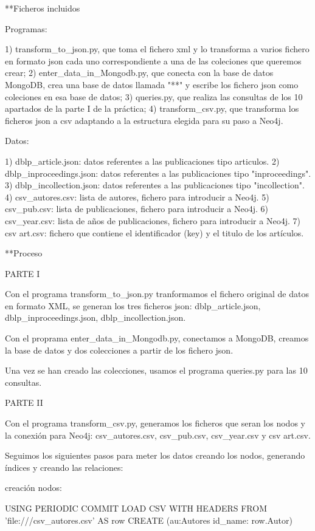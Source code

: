 **Ficheros incluidos

Programas:

1) transform_to_json.py, que toma el fichero xml y lo transforma a varios fichero en formato json cada uno correspondiente a una de las coleciones que queremos crear;
2) enter_data_in_Mongodb.py, que conecta con la base de datos MongoDB, crea una base de datos llamada "**" y escribe los fichero json como coleciones en esa base de datos;
3) queries.py, que  realiza las consultas de los 10 apartados de la parte I de la pr\'actica;
4) transform_csv.py, que transforma los ficheros json a csv adaptando a la estructura elegida
 para su paso a Neo4j.

Datos:

1) dblp_article.json: datos referentes a las publicaciones tipo articulos.
2) dblp_inproceedings.json: datos referentes a las publicaciones tipo "inproceedings".
3) dblp_incollection.json: datos referentes a las publicaciones tipo "incollection".
4) csv_autores.csv: lista de autores, fichero para introducir a Neo4j.
5) csv_pub.csv: lista de publicaciones, fichero para introducir a Neo4j.
6) csv_year.csv: lista de años de publicaciones, fichero para introducir a Neo4j.
7) csv art.csv: fichero que contiene el identificador (key) y el titulo de los artículos.



**Proceso

PARTE I

Con el programa transform_to_json.py tranformamos el fichero original de datos en formato XML, se generan
 los tres ficheros json: dblp_article.json, dblp_inproceedings.json, dblp_incollection.json.

Con el proprama enter_data_in_Mongodb.py, conectamos a MongoDB, creamos la base de datos y dos colecciones
 a partir de los fichero json.

Una vez se han creado las colecciones, usamos el programa queries.py para las 10 consultas.

PARTE II

Con el programa transform_csv.py, generamos los ficheros que seran los nodos y la conexión para Neo4j:
csv_autores.csv, csv_pub.csv, csv_year.csv y csv art.csv.

Seguimos los siguientes pasos para meter los datos creando los nodos, generando índices y creando las relaciones:

creación nodos:

USING PERIODIC COMMIT
LOAD CSV  WITH HEADERS FROM 'file:///csv_autores.csv' AS row
CREATE (au:Autores { id_name: row.Autor})

